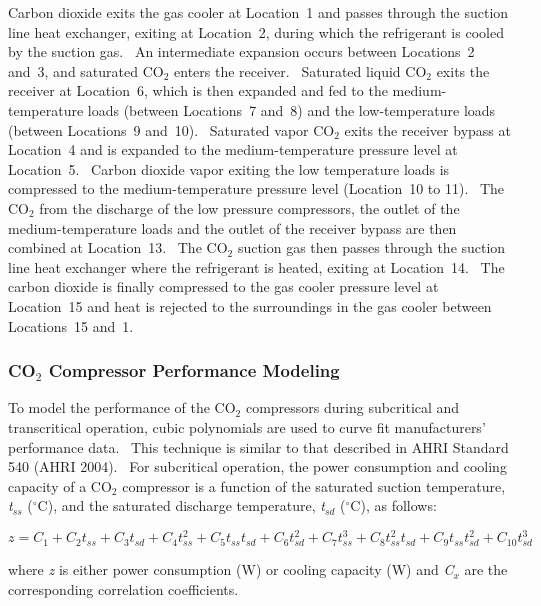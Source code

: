 Carbon dioxide exits the gas cooler at Location~1 and passes through the suction line heat exchanger, exiting at Location~2, during which the refrigerant is cooled by the suction gas.~ An intermediate expansion occurs between Locations~2 and~3, and saturated CO\(_{2}\) enters the receiver.~ Saturated liquid CO\(_{2}\) exits the receiver at Location~6, which is then expanded and fed to the medium-temperature loads (between Locations~7 and~8) and the low-temperature loads (between Locations~9 and~10).~ Saturated vapor CO\(_{2}\) exits the receiver bypass at Location~4 and is expanded to the medium-temperature pressure level at Location~5.~ Carbon dioxide vapor exiting the low temperature loads is compressed to the medium-temperature pressure level (Location~10 to 11).~ The CO\(_{2}\) from the discharge of the low pressure compressors, the outlet of the medium-temperature loads and the outlet of the receiver bypass are then combined at Location~13.~ The CO\(_{2}\) suction gas then passes through the suction line heat exchanger where the refrigerant is heated, exiting at Location~14.~ The carbon dioxide is finally compressed to the gas cooler pressure level at Location~15 and heat is rejected to the surroundings in the gas cooler between Locations~15 and~1.

\subsubsection{CO\(_{2}\) Compressor Performance Modeling}\label{coux5f2-compressor-performance-modeling}

To model the performance of the CO\(_{2}\) compressors during subcritical and transcritical operation, cubic polynomials are used to curve fit manufacturers' performance data.~ This technique is similar to that described in AHRI Standard 540 (AHRI 2004).~ For subcritical operation, the power consumption and cooling capacity of a CO\(_{2}\) compressor is a function of the saturated suction temperature, \emph{t\(_{ss}\)} (\(^{\circ}\)C), and the saturated discharge temperature, \emph{t\(_{sd}\)} (\(^{\circ}\)C), as follows:

\begin{equation}
z = {C_1} + {C_2}{t_{ss}} + {C_3}{t_{sd}} + {C_4}t_{ss}^2 + {C_5}{t_{ss}}{t_{sd}} + {C_6}t_{sd}^2 + {C_7}t_{ss}^3 + {C_8}t_{ss}^2{t_{sd}} + {C_9}{t_{ss}}t_{sd}^2 + {C_{10}}t_{sd}^3
\end{equation}

where \emph{z} is either power consumption (W) or cooling capacity (W) and \emph{C\(_{x}\)} are the corresponding correlation coefficients.

